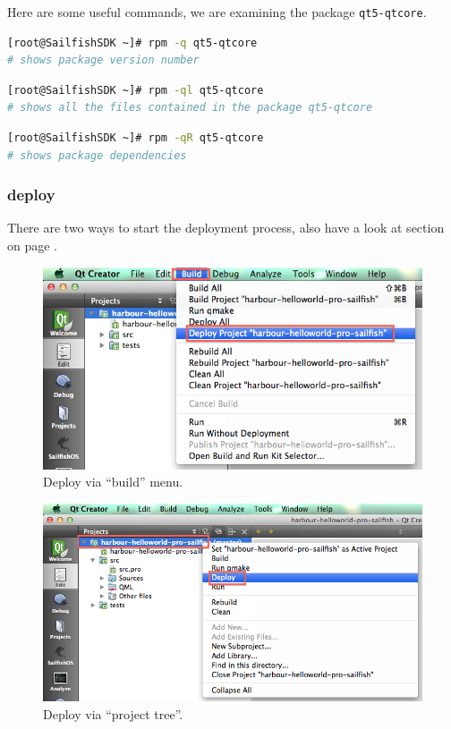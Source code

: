 Here are some useful commands, we are examining the package \verb,qt5-qtcore,.

\begin{lstlisting}[language=bash]
[root@SailfishSDK ~]# rpm -q qt5-qtcore
# shows package version number
\end{lstlisting}
%
\begin{lstlisting}[language=bash]
[root@SailfishSDK ~]# rpm -ql qt5-qtcore
# shows all the files contained in the package qt5-qtcore
\end{lstlisting}
%
\begin{lstlisting}[language=bash]
[root@SailfishSDK ~]# rpm -qR qt5-qtcore
# shows package dependencies
\end{lstlisting}

%
%
\subsubsection{deploy}\label{subsubsec:deploy}
%
There are two ways to start the deployment process, also have a look at  section  on page \pageref{subsubsec:runsettings}.
%
\begin{figure}[H]
  \centering
  \includegraphics[scale=0.5]{../media/gfx/QtCreator/deploy01-01.png} 
  \caption{Deploy via ``build'' menu.}
  \label{fig:deploy01-01}
\end{figure}
%
% 
\begin{figure}[H]
  \centering
  \includegraphics[scale=0.5]{../media/gfx/QtCreator/deploy01-02.png} 
  \caption{Deploy via ``project tree''.}
  \label{fig:deploy01-02}
\end{figure}
%
%
